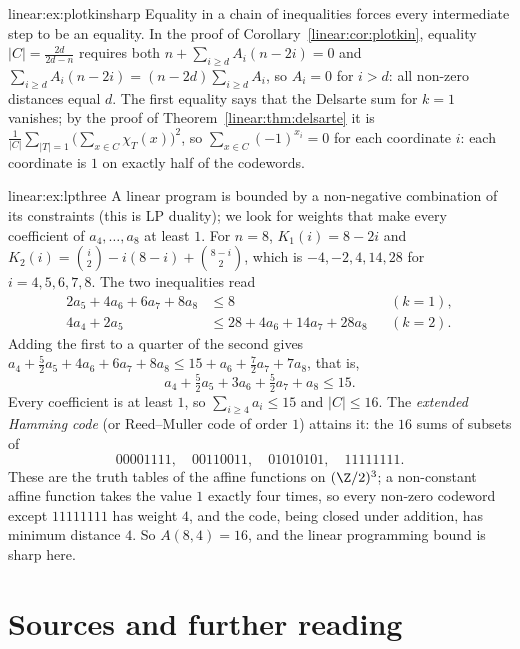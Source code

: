\begin{solution}{linear:ex:plotkinsharp}
\idea Equality in a chain of inequalities forces every intermediate step to be an equality.
\writeup In the proof of Corollary~\ref{linear:cor:plotkin}, equality $|C|=\frac{2d}{2d-n}$ requires both $n+\sum_{i\ge d}A_i(n-2i)=0$ and
$\sum_{i\ge d}A_i(n-2i)=(n-2d)\sum_{i\ge d}A_i$, so $A_i=0$ for $i>d$: all non-zero distances equal $d$. The first equality says that the
Delsarte sum for $k=1$ vanishes; by the proof of Theorem~\ref{linear:thm:delsarte} it is $\frac1{|C|}\sum_{|T|=1}\bigl(\sum_{x\in C}\chi_T(x)
\bigr)^2$, so $\sum_{x\in C}(-1)^{x_i}=0$ for each coordinate $i$: each coordinate is $1$ on exactly half of the codewords.
\end{solution}

\begin{solution}{linear:ex:lpthree}
\idea A linear program is bounded by a non-negative combination of its constraints (this is LP duality); we look for weights that
make every coefficient of $a_4,\dots,a_8$ at least $1$.
\writeup For $n=8$, $K_1(i)=8-2i$ and $K_2(i)=\binom i2-i(8-i)+\binom{8-i}2$, which is $-4,-2,4,14,28$ for $i=4,5,6,7,8$. The two
inequalities read
\[
\begin{aligned}
2a_5+4a_6+6a_7+8a_8&\le8&&(k=1),\\
4a_4+2a_5&\le28+4a_6+14a_7+28a_8&&(k=2).
\end{aligned}
\]
Adding the first to a quarter of the second gives $a_4+\frac52a_5+4a_6+6a_7+8a_8\le15+a_6+\frac72a_7+7a_8$, that is,
\[
a_4+\tfrac52a_5+3a_6+\tfrac52a_7+a_8\le15.
\]
Every coefficient is at least $1$, so $\sum_{i\ge4}a_i\le15$ and $|C|\le16$. The \emph{extended Hamming code} (or Reed--Muller code
of order $1$) attains it: the $16$ sums of subsets of
\[
00001111,\quad 00110011,\quad 01010101,\quad 11111111.
\]
These are the truth tables of the affine functions on $(\Z/2)^3$; a non-constant affine function takes the value $1$ exactly four
times, so every non-zero codeword except $11111111$ has weight $4$, and the code, being closed under addition, has minimum distance
$4$. So $A(8,4)=16$, and the linear programming bound is sharp here.
\end{solution}

\section*{Sources and further reading}

